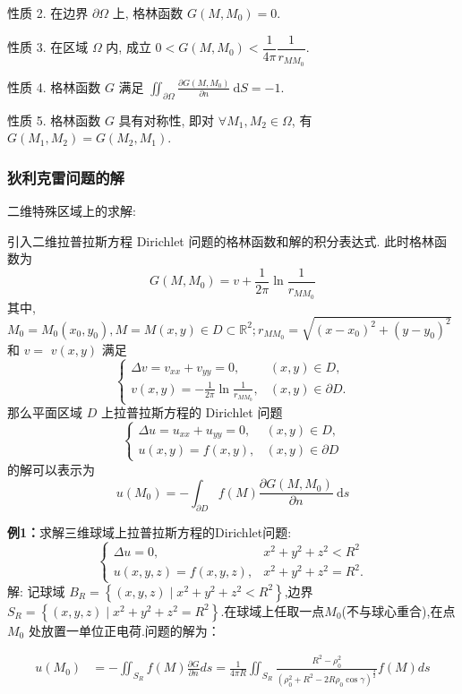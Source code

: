 性质 2. 在边界 $ \partial \Omega $ 上, 格林函数 $ G\left(M, M_{0}\right)=0 $.

性质 3. 在区域 $ \Omega $ 内, 成立 $ 0<G\left(M, M_{0}\right)<\dfrac{1}{4 \pi} \dfrac{1}{r_{M M_{0}}} $.

性质 4. 格林函数 $ G $ 满足 $ \iint_{\partial \Omega} \frac{\partial G\left(M, M_{0}\right)}{\partial n} \mathrm{~d} S=-1 $.

性质 5. 格林函数 $ G $ 具有对称性, 即对 $ \forall M_{1}, M_{2} \in \Omega $, 有 $ G\left(M_{1}, M_{2}\right)=G\left(M_{2}, M_{1}\right) $.

\subsubsection{狄利克雷问题的解}
二维特殊区域上的求解:

引入二维拉普拉斯方程 Dirichlet 问题的格林函数和解的积分表达式. 此时格林函数为
$$
G\left(M, M_{0}\right)=v+\frac{1}{2 \pi} \ln \frac{1}{r_{M M_{0}}}
$$
其中, $ M_{0}=M_{0}\left(x_{0}, y_{0}\right), M=M(x, y) \in D \subset \mathbb{R}^{2} ; r_{M M_{0}}=\sqrt{\left(x-x_{0}\right)^{2}+\left(y-y_{0}\right)^{2}} $ 和 $ v= $ $ v(x, y) $ 满足
$$
\left\{\begin{array}{ll}
\Delta v=v_{x x}+v_{y y}=0, & (x, y) \in D, \\
v(x, y)=-\frac{1}{2 \pi} \ln \frac{1}{r_{M M_{0}}}, & (x, y) \in \partial D .
\end{array}\right.
$$
那么平面区域 $ D $ 上拉普拉斯方程的 Dirichlet 问题
$$
\left\{\begin{array}{ll}
\Delta u=u_{x x}+u_{y y}=0, & (x, y) \in D, \\
u(x, y)=f(x, y), & (x, y) \in \partial D
\end{array}\right.
$$
的解可以表示为
$$
u\left(M_{0}\right)=-\int_{\partial D} f(M) \frac{\partial G\left(M, M_{0}\right)}{\partial n} \mathrm{~d} s
$$

\textbf{例1：}求解三维球域上拉普拉斯方程的Dirichlet问题:
$$
\left\{\begin{array}{cc}
\Delta u=0, & x^{2}+y^{2}+z^{2}<R^{2} \\
u(x, y, z)=f(x, y, z), & x^{2}+y^{2}+z^{2}=R^{2} .
\end{array}\right.
$$
解: 记球域 $ B_{R}=\left\{(x, y, z) \mid x^{2}+y^{2}+z^{2}<R^{2}\right\} $,边界 $ S_{R}=\left\{(x, y, z) \mid x^{2}+y^{2}+z^{2}=R^{2}\right\} $.在球域上任取一点$M_0$(不与球心重合),在点 $ M_{0} $ 处放置一单位正电荷.问题的解为：

$$
\begin{aligned}
u\left(M_{0}\right) & =-\iint_{S_{R}} f(M) \frac{\partial G}{\partial n} d s=\frac{1}{4 \pi R} \iint_{S_{R}} \frac{R^{2}-\rho_{0}^{2}}{\left(\rho_{0}^{2}+R^{2}-2 R \rho_{0} \cos \gamma\right)^{\frac{3}{2}}} f(M) d s \\
\end{aligned}
$$

